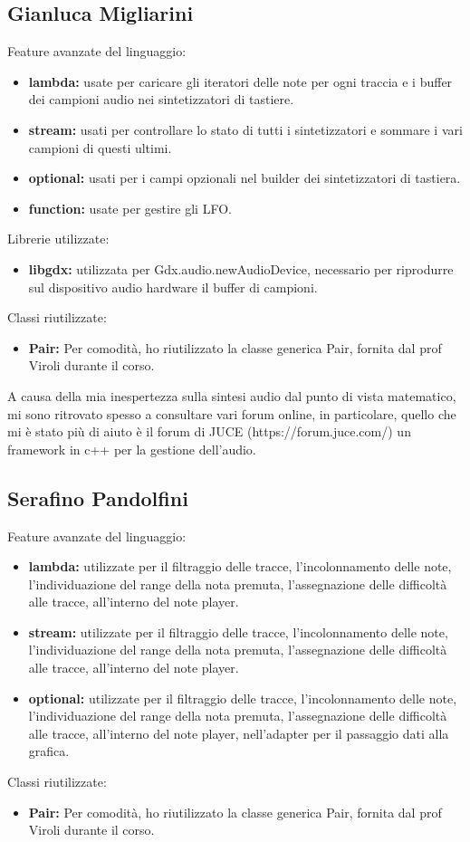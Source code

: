 \documentclass[a4paper,12pt]{report}
\begin{document}
\subsection{Gianluca Migliarini}
Feature avanzate del linguaggio:
\begin{itemize}
	\item \textbf{lambda:} usate per caricare gli iteratori delle note per ogni traccia e i buffer dei campioni audio nei sintetizzatori di tastiere.
	\item \textbf{stream:} usati per controllare lo stato di tutti i sintetizzatori e sommare i vari campioni di questi ultimi.
	\item \textbf{optional:} usati per i campi opzionali nel builder dei sintetizzatori di tastiera. 
	\item \textbf{function:} usate per gestire gli LFO.
\end{itemize}
Librerie utilizzate:
\begin{itemize}
	\item \textbf{libgdx:} utilizzata per Gdx.audio.newAudioDevice, necessario per riprodurre sul dispositivo audio hardware il buffer di campioni.
\end{itemize}
 Classi riutilizzate:
\begin{itemize}
	\item \textbf{Pair:} Per comodità, ho riutilizzato la classe generica Pair, fornita dal prof Viroli durante il corso. 
\end{itemize}
 A causa della mia inespertezza sulla sintesi audio dal punto di vista matematico, mi sono ritrovato spesso a consultare vari forum online, in particolare, quello che mi è stato più di aiuto è il forum di JUCE (https://forum.juce.com/) un framework in c++ per la gestione dell'audio.
\newpage

\subsection{Serafino Pandolfini}
Feature avanzate del linguaggio:
\begin{itemize}
	\item \textbf{lambda:} utilizzate per il filtraggio delle tracce, l'incolonnamento delle note, l'individuazione del range della nota premuta, l'assegnazione delle difficoltà alle tracce, all'interno del note player.
	\item \textbf{stream:} utilizzate per il filtraggio delle tracce, l'incolonnamento delle note, l'individuazione del range della nota premuta, l'assegnazione delle difficoltà alle tracce, all'interno del note player.
	\item \textbf{optional:} utilizzate per il filtraggio delle tracce, l'incolonnamento delle note, l'individuazione del range della nota premuta, l'assegnazione delle difficoltà alle tracce, all'interno del note player, nell'adapter per il passaggio dati alla grafica.
\end{itemize}
 Classi riutilizzate:
\begin{itemize}
	\item \textbf{Pair:} Per comodità, ho riutilizzato la classe generica Pair, fornita dal prof Viroli durante il corso. 
\end{itemize}
\newpage
\end{document}

